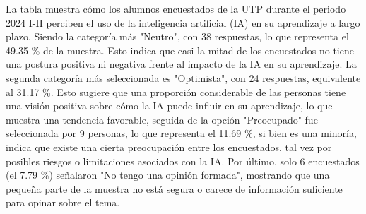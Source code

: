La tabla muestra cómo los alumnos encuestados de la UTP durante el periodo 
2024 I-II perciben el uso de la inteligencia artificial (IA) en su aprendizaje a largo plazo. Siendo la 
categoría más "Neutro", con 38 respuestas, lo que representa el 49.35 \% de la muestra. Esto indica 
que casi la mitad de los encuestados no tiene una postura positiva ni negativa frente al impacto de 
la IA en su aprendizaje. La segunda categoría más seleccionada es "Optimista", con 24 respuestas, 
equivalente al 31.17 \%. Esto sugiere que una proporción considerable de las personas tiene una 
visión positiva sobre cómo la IA puede influir en su aprendizaje, lo que muestra una tendencia 
favorable, seguida de la opción "Preocupado" fue seleccionada por 9 personas, lo que representa 
el 11.69 \%, si bien es una minoría, indica que existe una cierta preocupación entre los encuestados, 
tal vez por posibles riesgos o limitaciones asociados con la IA. Por último, solo 6 encuestados (el 
7.79 \%) señalaron "No tengo una opinión formada", mostrando que una pequeña parte de la 
muestra no está segura o carece de información suficiente para opinar sobre el tema.


